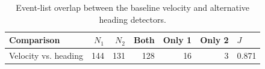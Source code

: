 \begin{table}[htbp]
\caption{Event-list overlap between the baseline velocity and alternative heading detectors.}
\label{tab:method_comparison}
\begin{tabular}{lrrrrrl}
\toprule
Comparison & $N_1$ & $N_2$ & Both & Only 1 & Only 2 & $J$ \\
\midrule
Velocity vs. heading & 144 & 131 & 128 & 16 & 3 & 0.871 \\
\bottomrule
\end{tabular}
\end{table}
